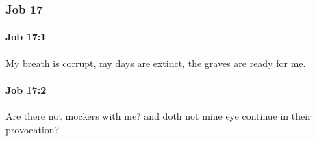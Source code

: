 	\subsubsection{Job 17} %
		\label{JOB-17}

		\paragraph{Job 17:1} %
			\label{JOB-17-1}

			My breath is corrupt, my days are extinct, the graves are ready for me.


		\paragraph{Job 17:2} %
			\label{JOB-17-2}

			Are there not mockers with me? and doth not mine eye continue in their provocation?

